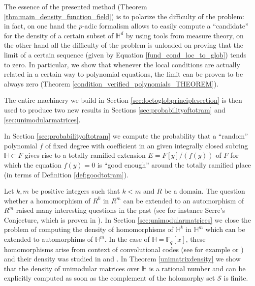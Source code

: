 \documentclass[10pt]{amsart}
\newcommand{\vH}{\mathbb{H}}
\newcommand{\cS}{\mathcal{S}}
\theoremstyle{definition}
\theoremstyle{remark}
\numberwithin{equation}{section}
\begin{document}
The essence of the presented method (Theorem \ref{thm:main_density_function_field}) is to polarize the difficulty of the problem: in fact, on one hand the $p$-adic formalism allows to easily compute a ``candidate'' for the density of a certain subset of $\vH^d$ by using tools from measure theory, on the other hand all the difficulty of the problem is unloaded on proving that the limit of a certain sequence (given by Equation \eqref{fund_cond_loc_to_glob}) tends to zero. 
In particular, we show that whenever the local conditions are actually related in a certain way to polynomial equations, the limit can be proven to be always zero (Theorem \ref{condition_verified_polynomials_THEOREM}). 

The entire machinery we build in Section \ref{sec:loctoglobprinciplesection}  is then used to produce two new results in Sections \ref{sec:probabilityoftotram} and \ref{sec:unimodularmatrices}. 

In Section \ref{sec:probabilityoftotram} we compute the
 probability that a ``random'' polynomial $f$ of fixed degree with coefficient in an given integrally closed subring $\vH\subset F$ gives rise to a totally ramified extension $E=F[y]/(f(y))$ of $F$ for which the equation $f(y)=0$ is ``good enough'' around the totally ramified place (in terms of Definition
\ref{def:goodtotram}). 


Let $k,m$ be positive integers such that $k<m$ and $R$ be a domain. The question whether a homomorphism of $R^k$ in $R^m$ can be extended to an automorphism of $R^m$ raised many interesting questions in the past (see for instance Serre's Conjecture, which is proven in \cite{suslin1974projective,bib:projmod}).
In Section \ref{sec:unimodularmatrices} we close the problem of computing the density of homomorphisms of $\vH^k$ in $\vH^m$ which can be extended to automorphims of $\vH^m$. In the case of $\vH=\mathbb F_q[x]$, these homomorphisms arise from context of convolutional codes (see for example \cite{FORNASINI2004119} or \cite{rosenthal2001connections}) and their density was studied in \cite{bib:guo2013probability} and \cite{micheli2016density}.
In Theorem \ref{unimatrixdensity} we show that the density of unimodular matrices over $\vH$ is a rational number and can be explicitly computed as soon as the complement of the holomorphy set $\cS$ is finite.
\end{document}
